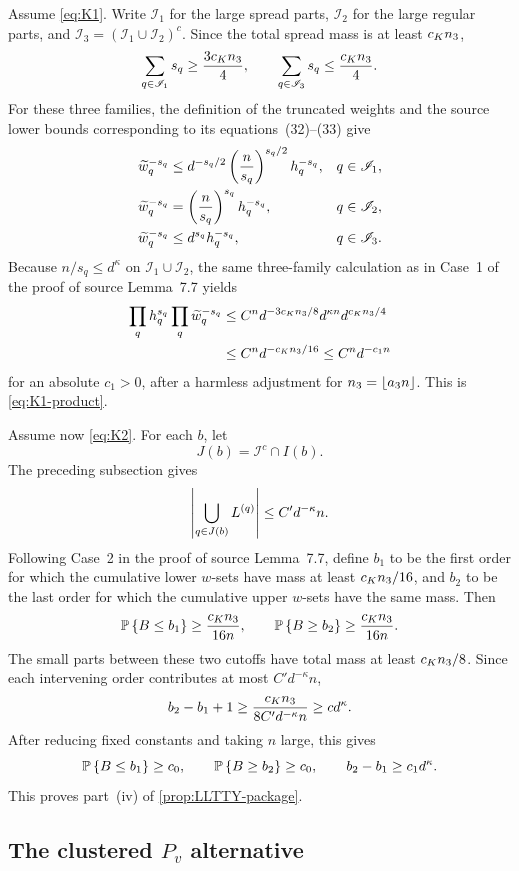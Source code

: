 Assume \eqref{eq:K1}. Write $\mathscr I_1$ for the large spread parts, $\mathscr I_2$ for the large regular parts, and $\mathscr I_3=(\mathscr I_1\cup\mathscr I_2)^c$. Since the total spread mass is at least $c_K n_3$,
\[
  \sum_{q\in\mathscr I_1}s_q\ge\frac{3c_K n_3}{4},
  \qquad
  \sum_{q\in\mathscr I_3}s_q\le\frac{c_K n_3}{4}.
\]
For these three families, the definition of the truncated weights and the source lower bounds corresponding to its equations~(32)--(33) give
\begin{align*}
  \widetilde w_q^{-s_q}
  &\le d^{-s_q/2}\left(\frac n{s_q}\right)^{s_q/2}h_q^{-s_q},
  &&q\in\mathscr I_1,\\
  \widetilde w_q^{-s_q}
  &=\left(\frac n{s_q}\right)^{s_q}h_q^{-s_q},
  &&q\in\mathscr I_2,\\
  \widetilde w_q^{-s_q}
  &\le d^{s_q}h_q^{-s_q},
  &&q\in\mathscr I_3.
\end{align*}
Because $n/s_q\le d^\kappa$ on $\mathscr I_1\cup\mathscr I_2$, the same three-family calculation as in Case~1 of the proof of source Lemma~7.7 yields
\begin{align*}
  \prod_qh_q^{s_q}\prod_q\widetilde w_q^{-s_q}
  &\le C^n d^{-3c_K n_3/8}d^{\kappa n}d^{c_K n_3/4}\\
  &\le C^n d^{-c_K n_3/16}
  \le C^n d^{-c_1n}
\end{align*}
for an absolute $c_1>0$, after a harmless adjustment for $n_3=\left\lfloor a_3n\right\rfloor$. This is \eqref{eq:K1-product}.

Assume now \eqref{eq:K2}. For each $b$, let
\[
  J(b)=\mathscr I^c\cap I(b).
\]
The preceding subsection gives
\[
  \left|\bigcup_{q\in J(b)}L^{(q)}\right|\le C'd^{-\kappa}n.
\]
Following Case~2 in the proof of source Lemma~7.7, define $b_1$ to be the first order for which the cumulative lower $w$-sets have mass at least $c_K n_3/16$, and $b_2$ to be the last order for which the cumulative upper $w$-sets have the same mass. Then
\[
  \mathbb P\left\{B\le b_1\right\}\ge\frac{c_K n_3}{16n},
  \qquad
  \mathbb P\left\{B\ge b_2\right\}\ge\frac{c_K n_3}{16n}.
\]
The small parts between these two cutoffs have total mass at least $c_K n_3/8$. Since each intervening order contributes at most $C'd^{-\kappa}n$,
\[
  b_2-b_1+1
  \ge\frac{c_K n_3}{8C'd^{-\kappa}n}
  \ge cd^\kappa.
\]
After reducing fixed constants and taking $n$ large, this gives
\[
  \mathbb P\left\{B\le b_1\right\}\ge c_0,
  \qquad
  \mathbb P\left\{B\ge b_2\right\}\ge c_0,
  \qquad
  b_2-b_1\ge c_1d^\kappa.
\]
This proves part~(iv) of \cref{prop:LLTTY-package}.

\subsection{\texorpdfstring{The clustered $P_v$ alternative}{The clustered Pv alternative}}


